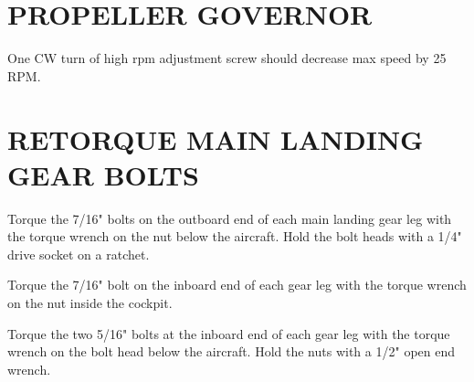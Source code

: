 
\section{PROPELLER GOVERNOR}
One CW turn of high rpm adjustment screw should decrease max speed by 25 RPM. 

\section{RETORQUE MAIN LANDING GEAR BOLTS}
  \begin{enumerate*}
    \item Torque the 7/16" bolts on the outboard end of each main landing gear leg with the torque wrench on the nut below the aircraft.  Hold the bolt heads with a 1/4" drive socket on a ratchet. 
    \item Torque the 7/16" bolt on the inboard end of each gear leg with the torque wrench on the nut inside the cockpit. 
    \item Torque the two 5/16" bolts at the inboard end of each gear leg with the torque wrench on the bolt head below the aircraft. Hold the nuts with a 1/2" open end wrench. 
\end{enumerate*}
\clearpage

